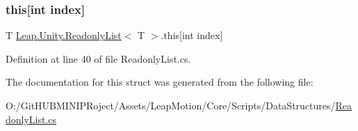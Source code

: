 \subsubsection{\texorpdfstring{this[int index]}{this[int index]}}
{\footnotesize\ttfamily T \mbox{\hyperlink{struct_leap_1_1_unity_1_1_readonly_list}{Leap.\+Unity.\+Readonly\+List}}$<$ T $>$.this\mbox{[}int index\mbox{]}\hspace{0.3cm}{\ttfamily [get]}}



Definition at line 40 of file Readonly\+List.\+cs.



The documentation for this struct was generated from the following file\+:\begin{DoxyCompactItemize}
\item 
O\+:/\+Git\+H\+U\+B\+M\+I\+N\+I\+P\+Roject/\+Assets/\+Leap\+Motion/\+Core/\+Scripts/\+Data\+Structures/\mbox{\hyperlink{_readonly_list_8cs}{Readonly\+List.\+cs}}\end{DoxyCompactItemize}
